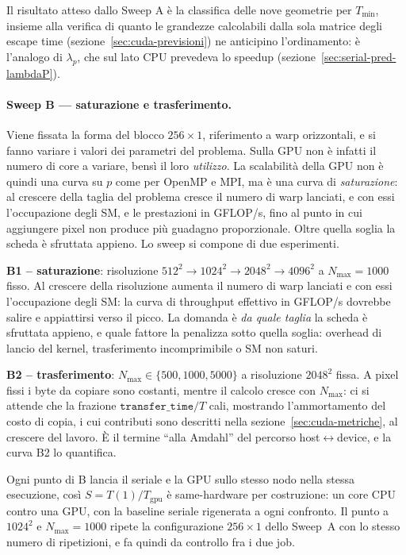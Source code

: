 Il risultato atteso dallo Sweep A è la classifica delle nove geometrie per
$T_{\min}$, insieme alla verifica di quanto le grandezze calcolabili dalla sola
matrice degli escape time (sezione~\ref{sec:cuda-previsioni}) ne anticipino
l'ordinamento: è l'analogo di $\lambda_p$, che sul lato CPU prevedeva lo speedup
(sezione~\ref{sec:serial-pred-lambdaP}).

\paragraph{Sweep B --- saturazione e trasferimento.}
Viene fissata la forma del blocco $256{\times}1$, riferimento a warp
orizzontali, e si fanno variare i valori dei parametri del problema. Sulla GPU
non è infatti il numero di core a variare, bensì il loro \emph{utilizzo}. La
scalabilità della GPU non è quindi una curva su $p$ come per OpenMP e MPI,
ma è una curva di \emph{saturazione}: al crescere della taglia del problema
cresce il numero di warp lanciati, e con essi l'occupazione degli SM, e le prestazioni in GFLOP/s, fino al
punto in cui aggiungere pixel non produce più guadagno proporzionale. Oltre
quella soglia la scheda è sfruttata appieno. Lo sweep si compone di due
esperimenti.

\textbf{B1 -- saturazione}: risoluzione $512^2 \to 1024^2 \to 2048^2 \to
4096^2$ a $N_{\max}=1000$ fisso.
Al crescere della risoluzione aumenta il
numero di warp lanciati e con essi l'occupazione degli SM: la curva di
throughput effettivo in GFLOP/s dovrebbe salire e appiattirsi verso il picco.
La domanda è \textit{da quale taglia} la scheda è sfruttata appieno, e quale
fattore la penalizza sotto quella soglia: overhead di lancio del kernel,
trasferimento incomprimibile o SM non saturi.

\textbf{B2 -- trasferimento}: $N_{\max} \in \{500, 1000, 5000\}$ a risoluzione
$2048^2$ fissa.
A pixel fissi i byte da copiare sono costanti, mentre il
calcolo cresce con $N_{\max}$: ci si attende che la frazione
$\texttt{transfer\_time}/T$ cali, mostrando l'ammortamento del costo di copia,
i cui contributi sono descritti nella sezione~\ref{sec:cuda-metriche}, al
crescere del lavoro. È il termine ``alla Amdahl'' del percorso
host$\leftrightarrow$device, e la curva B2 lo quantifica.

Ogni punto di B lancia il seriale e la GPU sullo stesso nodo nella stessa
esecuzione, così $S = T(1)/T_{\text{gpu}}$ è same-hardware per costruzione: un
core CPU contro una GPU, con la baseline seriale rigenerata a ogni confronto. Il
punto a $1024^2$ e $N_{\max}=1000$ ripete la configurazione $256{\times}1$ dello
Sweep~A con lo stesso numero di ripetizioni, e fa quindi da controllo fra i due
job.

